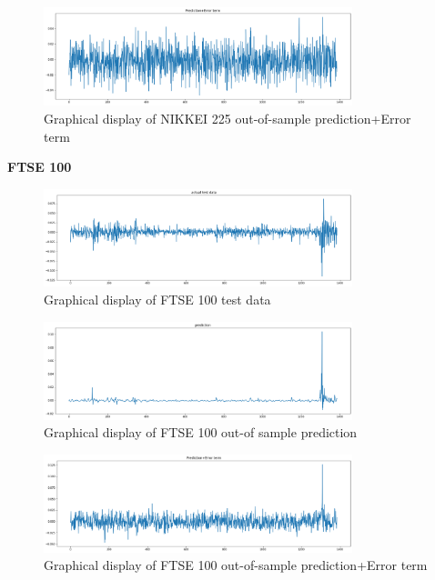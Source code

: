 \documentclass[a4paper,11pt,oneside]{book}
\begin{document}
\begin{figure}[!h]
	\centering
	\includegraphics[width=0.8\textwidth]{figures/NIKKEIERROR}
	\caption{Graphical display of NIKKEI 225 out-of-sample prediction+Error term}
	\label{NIKKEIERROR}
\end{figure}
\newpage
\vfill


\textbf{FTSE 100}
\begin{figure}[!h]
	\centering
	\includegraphics[width=0.8\textwidth]{figures/FTSETEST}
	\caption{Graphical display of FTSE 100 test data}
	\label{FTSETEST}
\end{figure}

\begin{figure}[!h]
	\centering
	\includegraphics[width=0.8\textwidth]{figures/FTSEPRED}
	\caption{Graphical display of FTSE 100 out-of sample prediction}
	\label{FTSEPRED}
\end{figure}


\begin{figure}[!h]
	\centering
	\includegraphics[width=0.8\textwidth]{figures/FTSEERROR}
	\caption{Graphical display of FTSE 100 out-of-sample prediction+Error term}
	\label{FTSEERROR}
\end{figure}
\end{document}
